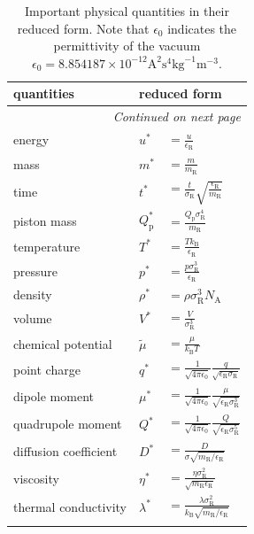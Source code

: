 	\begin{longtable}{lll}%
		
		\toprule
		quantities & \multicolumn{2}{l}{reduced form}\\
		\midrule
		\endhead
		\midrule
		\multicolumn{3}{r}{\textit{Continued on next page}}
		\endfoot
		
		\endlastfoot
		
		
		
		length & $l^{*}$ & $=\frac{l}{\sigma_{\text{R}}}$ \\
		energy & $u^{*}$ & $=\frac{u}{\epsilon_{\text{R}}}$ \\
		mass & $m^{*}$ & $=\frac{m}{m_{\text{R}}}$\\ 
		time & $t^{*}$ & $=\frac{t}{\sigma_{\text{R}}}\sqrt{\frac{\epsilon_{\text{R}}}{m_{\text{R}}}}$ \\
		piston mass & $Q^{*}_{\text{p}}$ & $=\frac{Q_{\text{p}}\sigma_{\text{R}}^{4}}{m_{\text{R}}}$ \\
		temperature & $T^{*}$ & $=\frac{Tk_{\text{B}}}{\epsilon_{\text{R}}}$ \\
		pressure & $p^{*}$ & $=\frac{p\sigma_{\text{R}}^{3}}{\epsilon_{\text{R}}}$ \\
		density & $\rho^{*}$ & $=\rho\sigma_{\text{R}}^{3}N_{\text{A}}$ \\                       
		volume & $V^{*}$ & $=\frac{V}{\sigma_{\text{R}}^{3}}$ \\
		chemical potential & $\tilde{\mu}$ & $=\frac{\mu}{k_{\text{B}}T}$ \\
		point charge & $q^{*}$ & $=\frac{1}{\sqrt{4 \pi \epsilon_{0}}}\frac{q}{\sqrt{\epsilon_{\text{R}}\sigma_{\text{R}}}}$ \\
		dipole moment & $\mu^{*}$ & $=\frac{1}{\sqrt{4 \pi \epsilon_{0}}}\frac{\mu}{\sqrt{\epsilon_{\text{R}}\sigma_{\text{R}}^{3}}}$ \\
		quadrupole moment & $Q^{*}$ & $=\frac{1}{\sqrt{4 \pi \epsilon_{0}}}\frac{Q}{\sqrt{\epsilon_{\text{R}}\sigma_{\text{R}}^{5}}}$ \\
		diffusion coefficient & $D^{*}$ & $=\frac{D}{\sigma\sqrt{m_{\text{R}}/ \epsilon_{\text{R}}}}$ \\
		viscosity & $\eta^{*}$ & $=\frac{\eta \sigma_{\text{R}}^{2}}{\sqrt{m_{\text{R}} \epsilon_{\text{R}}}}$ \\
		thermal conductivity & $\lambda^{*}$ & $=\frac{\lambda \sigma_{\text{R}}^{2}}{k_{\text{B}}\sqrt{m_{\text{R}} / \epsilon_{\text{R}}}}$ \\
		\bottomrule
		\caption{Important physical quantities in their reduced form. Note that $\epsilon_{0}$ indicates the permittivity of the vacuum $\epsilon_{0}=8.854187\times 10^{-12} \text{A}^{2}\text{s}^{4}\text{kg}^{-1}\text{m}^{-3}$.} 
		
		
	\end{longtable}	
	
